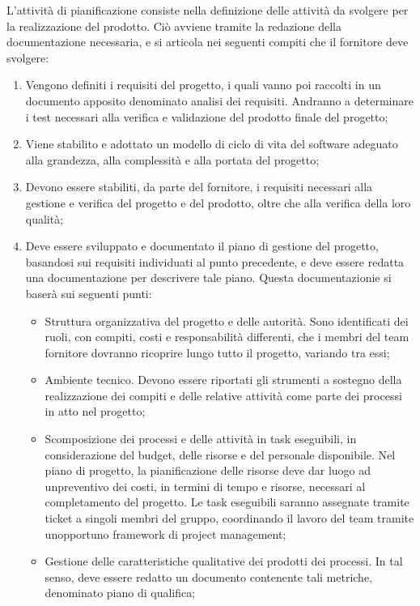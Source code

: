 L'attività di pianificazione consiste nella definizione delle attività da svolgere per la realizzazione del prodotto. Ciò avviene tramite la redazione della documentazione necessaria, e si articola nei seguenti compiti che il fornitore deve svolgere:
\begin{enumerate}
    \item Vengono definiti i requisiti del progetto, i quali vanno poi raccolti in un documento apposito denominato analisi dei requisiti. Andranno a determinare i test necessari alla verifica e validazione del prodotto finale del progetto;
    \item Viene stabilito e adottato un modello di ciclo di vita del software adeguato alla grandezza, alla complessità e alla portata del progetto;
    \item Devono essere stabiliti, da parte del fornitore, i requisiti necessari alla gestione e verifica del progetto e del prodotto, oltre che alla verifica della loro qualità;
    \item Deve essere sviluppato e documentato il piano di gestione del progetto, basandosi sui requisiti individuati al punto precedente, e deve essere redatta una documentazione per descrivere tale piano. Questa documentazionie si baserà sui seguenti punti:
    \begin{itemize}
        \item Struttura organizzativa del progetto e delle autorità. Sono identificati dei ruoli, con compiti, costi e responsabilità differenti, che i membri del team fornitore dovranno ricoprire lungo tutto il progetto, variando tra essi;
        \item Ambiente tecnico. Devono essere riportati gli strumenti a sostegno della realizzazione dei compiti e delle relative attività come parte dei processi in atto nel progetto;
        \item Scomposizione dei processi e delle attività in task eseguibili, in considerazione del budget, delle risorse e del personale disponibile. Nel piano di progetto, la pianificazione delle risorse deve dar luogo ad unpreventivo dei costi, in termini di tempo e risorse, necessari al completamento del progetto. Le task eseguibili saranno assegnate tramite ticket a singoli membri del gruppo, coordinando il lavoro del team tramite unopportuno framework di project management;
        \item Gestione delle caratteristiche qualitative dei prodotti dei processi. In tal senso, deve essere redatto un documento contenente tali metriche, denominato piano di qualifica;

\end{itemize}
\end{enumerate}
